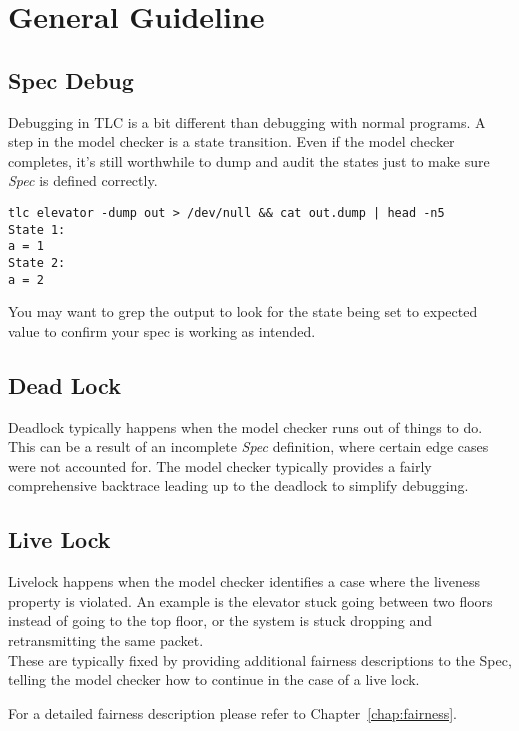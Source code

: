 \chapter{General Guideline}

\section{Spec Debug}

Debugging in TLC is a bit different than debugging with normal programs. A step
in the model checker is a state transition. Even if the model checker completes,
it's still worthwhile to dump and audit the states just to make sure
\textit{Spec} is defined correctly.

\begin{verbatim}
tlc elevator -dump out > /dev/null && cat out.dump | head -n5
State 1:
a = 1
State 2:
a = 2
\end{verbatim}

You may want to grep the output to look for the state being set to expected
value to confirm your spec is working as intended.

\section{Dead Lock}

Deadlock typically happens when the model checker runs out of things to do. This
can be a result of an incomplete \textit{Spec} definition, where certain edge
cases were not accounted for. The model checker typically provides a fairly
comprehensive backtrace leading up to the deadlock to simplify debugging.

\section{Live Lock}

Livelock happens when the model checker identifies a case where the liveness
property is violated. An example is the elevator stuck going between two floors 
instead of going to the top floor, or the system is stuck dropping and
retransmitting the same packet.\\

These are typically fixed by providing additional fairness descriptions to the
Spec, telling the model checker how to continue in the case of a live lock.\newline 

For a detailed fairness description please refer to Chapter~\ref{chap:fairness}.

